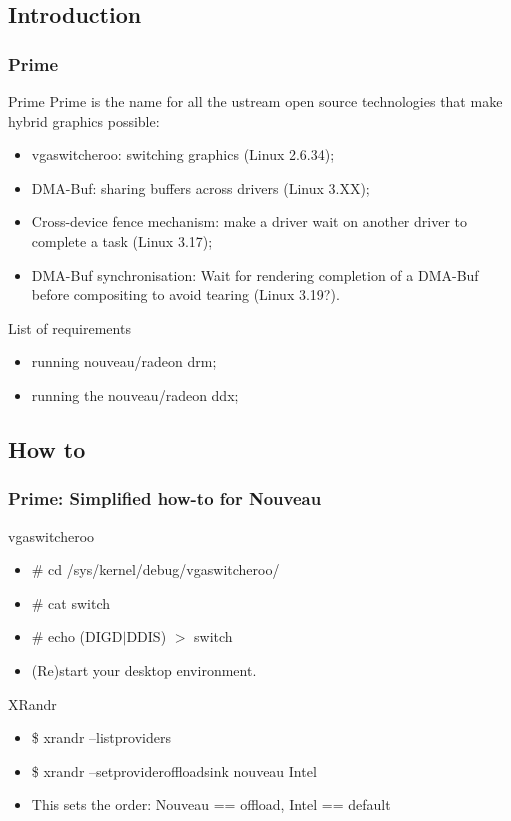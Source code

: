 \documentclass[11pt,english,compress]{beamer}
\begin{document}
\subsection{Introduction}
\begin{frame}
	\frametitle{Prime}

	\begin{block}{Prime}
		Prime is the name for all the ustream open source technologies
		that make hybrid graphics possible:
		\begin{itemize}
			\item vgaswitcheroo: switching graphics (Linux 2.6.34); %
			\item DMA-Buf: sharing buffers across drivers (Linux 3.XX); %
			\item Cross-device fence mechanism: make a driver wait on another driver to complete a task (Linux 3.17); %
			\item DMA-Buf synchronisation: Wait for rendering completion of a DMA-Buf before compositing to avoid tearing (Linux 3.19?).
		\end{itemize}
	\end{block}

	\begin{block}{List of requirements}
		\begin{itemize}
			\item running nouveau/radeon drm;
			\item running the nouveau/radeon ddx;
		\end{itemize}
	\end{block}
\end{frame}

\subsection{How to}
\begin{frame}
	\frametitle{Prime: Simplified how-to for Nouveau}


	\begin{block}{vgaswitcheroo}
		\begin{itemize}
			\item \# cd /sys/kernel/debug/vgaswitcheroo/
			\item \# cat switch
			\item \# echo (DIGD$|$DDIS) $>$ switch
			\item (Re)start your desktop environment.
		\end{itemize}
	\end{block}

	\begin{block}{XRandr}
		\begin{itemize}
			\item \$ xrandr --listproviders
			\item \$ xrandr --setprovideroffloadsink nouveau Intel
			\item This sets the order: Nouveau == offload, Intel == default
		\end{itemize}
	\end{block}
\end{frame}
\end{document}
